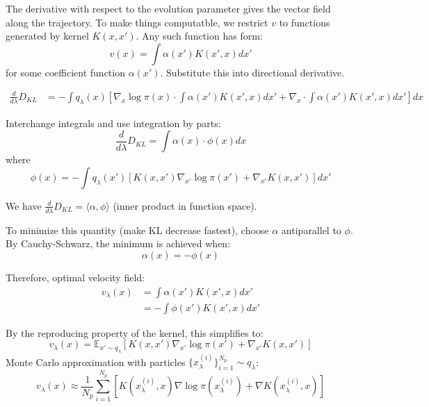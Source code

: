 \documentclass{article}
\begin{document}
The derivative with respect to the evolution parameter gives the vector field along the trajectory. To make things computatble, we restrict $v$ to functions generated by kernel $K(x,x')$. Any such function has form:
\begin{equation}
v(x) = \int \alpha(x') K(x', x) dx'
\end{equation}
for some coefficient function $\alpha(x')$. Substitute this into directional derivative.

\begin{align}
\frac{d}{d\lambda}D_{KL} &= -\int q_\lambda(x) \left[\nabla_x \log \pi(x) \cdot \int \alpha(x') K(x', x) dx' + \nabla_x \cdot \int \alpha(x') K(x', x) dx'\right] dx
\end{align}

Interchange integrals and use integration by parts:
\begin{equation}
\frac{d}{d\lambda} D_{KL} = \int \alpha(x) \cdot \phi(x) dx
\end{equation}
where
\begin{equation}
\phi(x) = -\int q_\lambda(x') \left[K(x,x')\nabla_{x'} \log \pi(x') + \nabla_{x'} K(x,x')\right] dx'
\end{equation}

We have $\frac{d}{d\lambda} D_{KL} = \langle \alpha, \phi \rangle$ (inner product in function space).

To minimize this quantity (make KL decrease fastest), choose $\alpha$ antiparallel to $\phi$. By Cauchy-Schwarz, the minimum is achieved when:
\begin{equation}
\alpha(x) = -\phi(x)
\end{equation}

Therefore, optimal velocity field:
\begin{align}
v_\lambda(x) &= \int \alpha(x') K(x', x) dx' \\
&= -\int \phi(x') K(x', x) dx'
\end{align}

By the reproducing property of the kernel, this simplifies to:
\begin{equation}
\boxed{v_\lambda(x) = \mathbb{E}_{x' \sim q_\lambda}\left[K(x,x')\nabla_{x'} \log \pi(x') + \nabla_{x'} K(x,x')\right]}
\end{equation}
Monte Carlo approximation with particles $\{x_\lambda^{(i)}\}_{i=1}^{N_p} \sim q_\lambda$:
\begin{equation}
v_\lambda(x) \approx \frac{1}{N_p} \sum_{i=1}^{N_p} \left[K(x^{(i)}_\lambda, x)\nabla \log \pi(x^{(i)}_\lambda) + \nabla K(x^{(i)}_\lambda, x)\right]
\end{equation}
\end{document}
